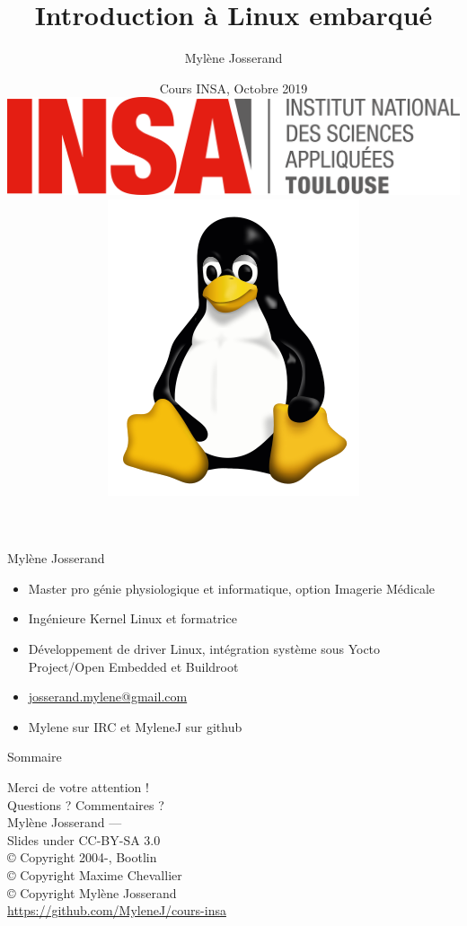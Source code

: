 \documentclass[aspectratio=169,obeyspaces,spaces,hyphens,dvipsnames]{beamer}
\title{Introduction à Linux embarqué}
\author[Mylène Josserand]
{Mylène Josserand}
\date[Octobre 2019]
{Cours INSA, Octobre 2019 \\
  \vspace{0.5cm}
  \includegraphics[scale=0.1]{pictures/insa-tls.png}
  \hspace{0.5cm}
  \includegraphics[scale=0.1]{pictures/tux.png}
}
\institute[]
{Développeuse et formatrice Linux embarqué}
\begin{document}
\begin{frame}
  \titlepage
\end{frame}

\begin{frame}{Mylène Josserand}
  \begin{itemize}
  \item Master pro génie physiologique et informatique, option Imagerie Médicale
  \item Ingénieure Kernel Linux et formatrice
  \item Développement de driver Linux, intégration système sous Yocto Project/Open Embedded et Buildroot
  \item \url{josserand.mylene@gmail.com}
  \item Mylene sur IRC et MyleneJ sur github
  \end{itemize}
\end{frame}

\begin{frame}{Sommaire}
  \tiny \tableofcontents%
\end{frame}







\begin{frame}
  \begin{center}
    \Huge
    Merci de votre attention ! \\
    Questions ? Commentaires ?\\
    \vspace{1cm}
    \large
    Mylène Josserand — \\
    \vspace{1cm}
    Slides under CC-BY-SA 3.0\\
    \scriptsize{© Copyright 2004-\the\year, Bootlin\\
    © Copyright Maxime Chevallier\\
    © Copyright Mylène Josserand\\
    \url{https://github.com/MyleneJ/cours-insa}}
  \end{center}
\end{frame}
\end{document}
